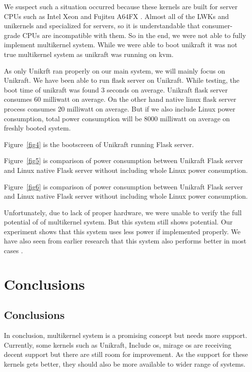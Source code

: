 \documentclass[11pt]{article}       %
\begin{document}
We suspect such a situation occurred because these kernels are built for server CPUs such as Intel Xeon and Fujitsu A64FX \cite{DEL01} \cite{DEL02} \cite{DEL04}. Almost all of the LWKs and unikernels and specialized for servers, so it is understandable that consumer-grade CPUs are incompatible with them. So in the end, we were not able to fully implement multikernel system. While we were able to boot unikraft it was not true multikernel system as unikraft was running on kvm.


As only Unikrft ran properly on our main system, we will mainly focus on Unikraft. We have been able to run flask server on Unikraft. While testing, the boot time of unikraft was found 3 seconds on average. Unikraft flask server consumes 60 milliwatt on average. On the other hand native linux flask server process consumes 20 milliwatt on average. But if we also include Linux power consumption, total power consumption will be 8000 milliwatt on average on freshly booted system.

Figure~\ref{fig4} is the bootscreen of Unikraft running Flask server.

Figure~\ref{fig5} is comparison of power consumption between Unikraft Flask server and Linux native Flask server without including whole Linux power consumption. 


Figure~\ref{fig6} is comparison of power consumption between Unikraft Flask server and Linux native Flask server without including whole Linux power consumption.


Unfortunately, due to lack of proper hardware, we were unable to verify the full potential of of multikernel system. But this system still shows potential. Our experiment shows that this system uses less power if implemented properly. We have also seen from earlier research that this system also performs better in most cases \cite{DEL14}. 



\section{Conclusions} \label{concl}


\subsection{Conclusions} 
In conclusion, multikernel system is a promising concept but needs more support. Currently, some kernels such as Unikraft, Include os, mirage os are receiving decent support but there are still room for improvement. As the support for these kernels gets better, they should also be more available to wider range of systems.
\end{document}
